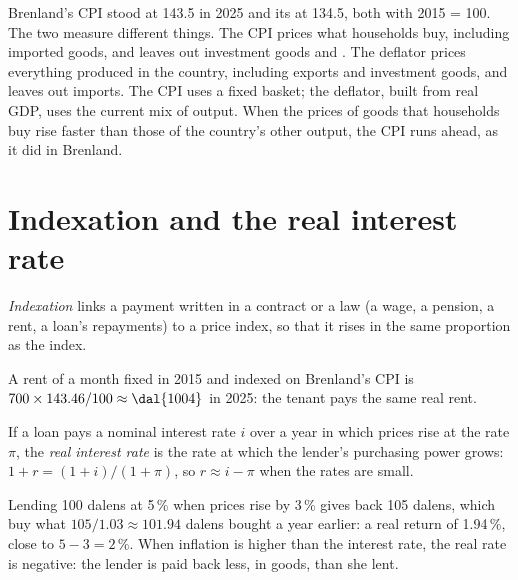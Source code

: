 Brenland's CPI stood at 143.5 in 2025 and its  at 134.5, both with 2015 = 100. The two measure different things. The CPI prices what households buy,
including imported goods, and leaves out investment goods and . The deflator prices everything produced in the country, including exports
and investment goods, and leaves out imports. The CPI uses a fixed basket; the deflator, built from real GDP, uses the current mix of output. When the prices of
goods that households buy rise faster than those of the country's other output, the CPI runs ahead, as it did in Brenland.

\section{Indexation and the real interest rate}\label{sec:g10:price-indices:indexation}

\begin{definition}[Indexation]\label{def:g10:price-indices:indexation}
\emph{Indexation} links a payment written in a contract or a law (a wage, a pension, a rent, a loan's repayments) to a price index, so that it
rises in the same proportion as the index.
\end{definition}

A rent of  a month fixed in 2015 and indexed on Brenland's CPI is $700 \times 143.46/100 \approx \text{\dal{1004}}$ in 2025: the tenant pays the same real rent.

\begin{definition}\label{def:g10:price-indices:real-interest-rate}
If a loan pays a nominal interest rate $i$ over a year in which prices rise at the rate $\pi$, the \emph{real interest rate} is the rate at
which the lender's purchasing power grows: $1 + r = (1 + i)/(1 + \pi)$, so $r \approx i - \pi$ when the rates are small.
\end{definition}

Lending 100 dalens at 5\,\% when prices rise by 3\,\% gives back 105 dalens, which buy what $105/1.03 \approx 101.94$ dalens bought a year earlier: a real return of
1.94\,\%, close to $5 - 3 = 2$\,\%. When inflation is higher than the interest rate, the real rate is negative: the lender is paid back less, in goods, than she
lent.

